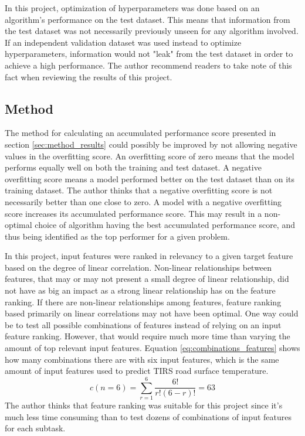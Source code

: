 	
	In this project, optimization of hyperparameters was done based on an algorithm's performance on the test dataset. This means that information from the test dataset was not necessarily previously unseen for any algorithm involved. If an independent validation dataset was used instead to optimize hyperparameters, information would not "leak" from the test dataset in order to achieve a high performance. The author recommend readers to take note of this fact when reviewing the results of this project. 

	\subsection{Method}

	The method for calculating an accumulated performance score presented in section \ref{sec:method_results} could possibly be improved by not allowing negative values in the overfitting score. An overfitting score of zero means that the model performs equally well on both the training and test dataset. A negative overfitting score means a model performed better on the test dataset than on its training dataset. The author thinks that a negative overfitting score is not necessarily better than one close to zero. A model with a negative overfitting score increases its accumulated performance score. This may result in a non-optimal choice of algorithm having the best accumulated performance score, and thus being identified as the top performer for a given problem.

	In this project, input features were ranked in relevancy to a given target feature based on the degree of linear correlation. Non-linear relationships between features, that may or may not present a small degree of linear relationship, did not have as big an impact as a strong linear relationship has on the feature ranking. If there are non-linear relationships among features, feature ranking based primarily on linear correlations may not have been optimal. One way could be to test all possible combinations of features instead of relying on an input feature ranking. However, that would require much more time than varying the amount of top relevant input features. Equation \ref{eq:combinations_features} shows how many combinations there are with six input features, which is the same amount of input features used to predict TIRS road surface temperature.
\begin{equation} \label{eq:combinations_features}
	c(n= 6) = \sum_{r=1}^{6} \frac{6!}{r!(6-r)!} = 63
\end{equation} 
	The author thinks that feature ranking was suitable for this project since it's much less time consuming than to test dozens of combinations of input features for each subtask. 

